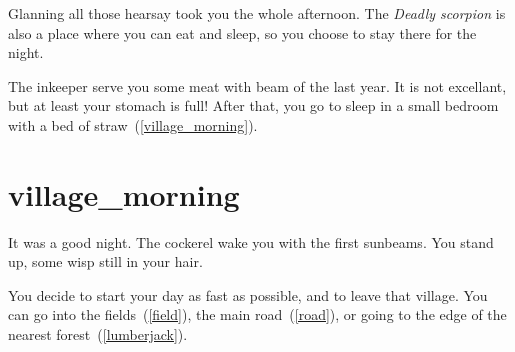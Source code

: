 Glanning all those hearsay took you the whole afternoon. The \textit{Deadly
scorpion} is also a place where you can eat and sleep, so you choose to stay
there for the night.

The inkeeper serve you some meat with beam of the last year. It is not
excellant, but at least your stomach is full! After that, you go to sleep in a
small bedroom with a bed of straw~(\ref{village_morning}).

\section{village_morning}

It was a good night. The cockerel wake you with the first sunbeams. You stand
up, some wisp still in your hair.

You decide to start your day as fast as possible, and to leave that village.
You can go into the fields~(\ref{field}), the main road~(\ref{road}), or
going to the edge of the nearest forest~(\ref{lumberjack}).

